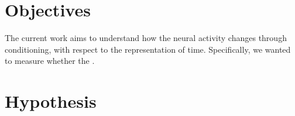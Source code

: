         
\section{Objectives}
    The current work aims to understand how the neural activity changes through conditioning, with respect to the representation of time. Specifically, we wanted to measure whether the .

\section{Hypothesis}